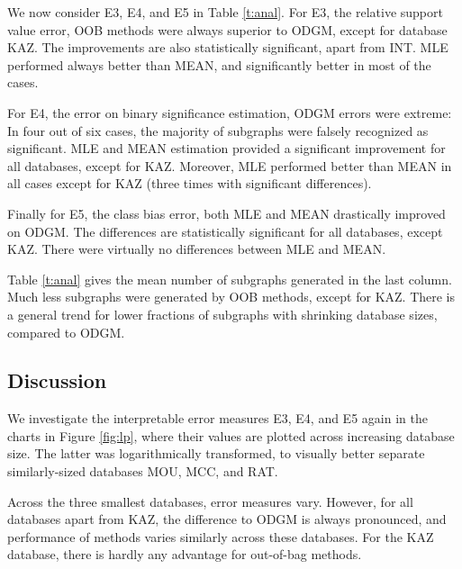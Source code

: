 \documentclass{sig-alternate}
\begin{document}
We now consider E3, E4, and E5 in Table \ref{t:anal}. 
For E3, the relative support value error,
OOB methods were always superior to ODGM, except for database KAZ. 
The improvements are also statistically significant, apart from INT.
MLE performed always better than MEAN, and significantly better in most of the cases.

For E4, the error on binary significance estimation, ODGM errors were extreme: 
In four out of six cases, the majority of subgraphs were falsely recognized as significant. 
MLE and MEAN estimation provided a significant improvement for all databases, except for KAZ. 
Moreover, MLE performed better than MEAN in
all cases except for KAZ (three times with significant differences). 

Finally for E5, the class bias error, both MLE and MEAN drastically improved on ODGM. The differences
are statistically significant for all databases, except KAZ. There were virtually no differences between MLE and MEAN.

Table \ref{t:anal} gives the mean number of subgraphs generated in the
last column. Much less subgraphs were generated by OOB methods, except for KAZ.
There is a general trend for lower fractions of subgraphs
with shrinking database sizes, compared to ODGM. 

\subsection{Discussion}
We investigate the interpretable error measures E3, E4, and E5 again in
the charts in Figure \ref{fig:lp}, where their values are plotted across 
increasing database size. The latter was logarithmically transformed, to
visually better separate similarly-sized databases MOU, MCC, and RAT. 

Across the three smallest databases, error measures vary. However, for all databases apart from KAZ, the difference
to ODGM is always pronounced, and performance of methods varies similarly across these databases. For the KAZ database, there is hardly any advantage for out-of-bag methods.
\end{document}

